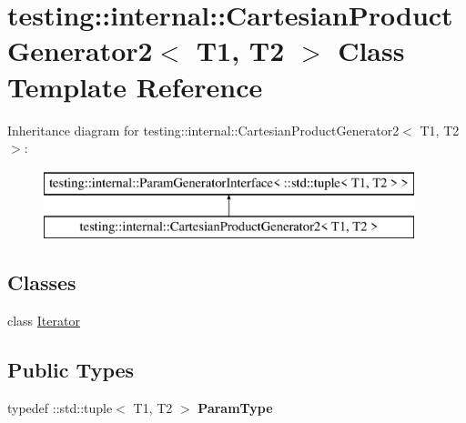 \hypertarget{classtesting_1_1internal_1_1_cartesian_product_generator2}{}\section{testing\+:\+:internal\+:\+:Cartesian\+Product\+Generator2$<$ T1, T2 $>$ Class Template Reference}
\label{classtesting_1_1internal_1_1_cartesian_product_generator2}
Inheritance diagram for testing\+:\+:internal\+:\+:Cartesian\+Product\+Generator2$<$ T1, T2 $>$\+:\begin{figure}[H]
\begin{center}
\leavevmode
\includegraphics[height=2.000000cm]{classtesting_1_1internal_1_1_cartesian_product_generator2}
\end{center}
\end{figure}
\subsection*{Classes}
\begin{DoxyCompactItemize}
\item 
class \mbox{\hyperlink{classtesting_1_1internal_1_1_cartesian_product_generator2_1_1_iterator}{Iterator}}
\end{DoxyCompactItemize}
\subsection*{Public Types}
\begin{DoxyCompactItemize}
\item 
\mbox{\label{classtesting_1_1internal_1_1_cartesian_product_generator2_a4dd5db877d076b52d44fb631e34cd47f}} 
typedef \+::std\+::tuple$<$ T1, T2 $>$ {\bfseries Param\+Type}
\end{DoxyCompactItemize}
